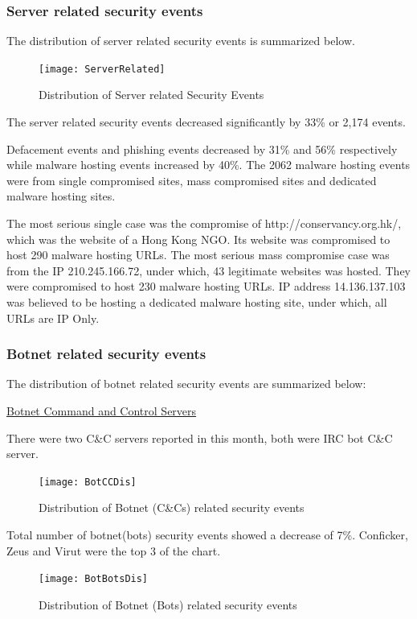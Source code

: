\documentclass[__FONT_SIZE__]{extarticle}
\begin{document}
\subsubsection*{Server related security events}
The distribution of server related security events is summarized below.

\begin{figure}[h!]
\centerline{\texttt{[image: ServerRelated]}}
\caption{Distribution of Server related Security Events}
\end{figure}

The server related security events decreased significantly by 33\% or 2,174 events.

Defacement events and phishing events decreased by 31\% and 56\% respectively while malware hosting events increased by 40\%.
The 2062 malware hosting events were from single compromised sites, mass compromised sites and dedicated malware hosting sites.

The most serious single case was the compromise of http://conservancy.org.hk/, which was the website of a Hong Kong NGO. Its website was compromised to host 290 malware hosting URLs. The most serious mass compromise case was from the IP 210.245.166.72, under which, 43 legitimate websites was hosted. They were compromised to host 230 malware hosting URLs. IP address 14.136.137.103 was believed to be hosting a dedicated malware hosting site, under which, all URLs are IP Only.


\subsubsection*{Botnet related security events}
The distribution of botnet related security events are summarized below:

\underline{Botnet Command and Control Servers}

There were two C\&C servers reported in this month, both were IRC bot C\&C server.

\begin{figure}[h!]
\centerline{\texttt{[image: BotCCDis]}}
\caption{Distribution of Botnet (C\&Cs) related security events}
\end{figure}

Total number of botnet(bots) security events showed a decrease of 7\%. Conficker, Zeus and Virut were the top 3 of the chart.

\begin{figure}[h!]
\centerline{\texttt{[image: BotBotsDis]}}
\caption{Distribution of Botnet (Bots) related security events}
\end{figure}
\end{document}
